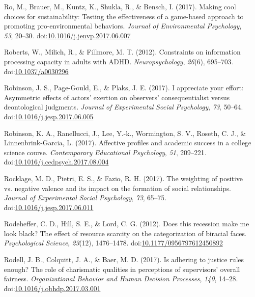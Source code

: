 \documentclass[english,man]{apa6}
\theoremstyle{definition}
\theoremstyle{definition}
\theoremstyle{definition}
\theoremstyle{remark}
\begin{document}
\hypertarget{ref-Ro2017}{}
Ro, M., Brauer, M., Kuntz, K., Shukla, R., \& Bensch, I. (2017). Making
cool choices for sustainability: Testing the effectiveness of a
game-based approach to promoting pro-environmental behaviors.
\emph{Journal of Environmental Psychology}, \emph{53}, 20--30.
doi:\href{https://doi.org/10.1016/j.jenvp.2017.06.007}{10.1016/j.jenvp.2017.06.007}

\hypertarget{ref-Roberts2012}{}
Roberts, W., Milich, R., \& Fillmore, M. T. (2012). Constraints on
information processing capacity in adults with ADHD.
\emph{Neuropsychology}, \emph{26}(6), 695--703.
doi:\href{https://doi.org/10.1037/a0030296}{10.1037/a0030296}

\hypertarget{ref-Robinson2017a}{}
Robinson, J. S., Page-Gould, E., \& Plaks, J. E. (2017). I appreciate
your effort: Asymmetric effects of actors' exertion on observers'
consequentialist versus deontological judgments. \emph{Journal of
Experimental Social Psychology}, \emph{73}, 50--64.
doi:\href{https://doi.org/10.1016/j.jesp.2017.06.005}{10.1016/j.jesp.2017.06.005}

\hypertarget{ref-Robinson2017}{}
Robinson, K. A., Ranellucci, J., Lee, Y.-k., Wormington, S. V., Roseth,
C. J., \& Linnenbrink-Garcia, L. (2017). Affective profiles and academic
success in a college science course. \emph{Contemporary Educational
Psychology}, \emph{51}, 209--221.
doi:\href{https://doi.org/10.1016/j.cedpsych.2017.08.004}{10.1016/j.cedpsych.2017.08.004}

\hypertarget{ref-Rocklage2017}{}
Rocklage, M. D., Pietri, E. S., \& Fazio, R. H. (2017). The weighting of
positive vs. negative valence and its impact on the formation of social
relationships. \emph{Journal of Experimental Social Psychology},
\emph{73}, 65--75.
doi:\href{https://doi.org/10.1016/j.jesp.2017.06.011}{10.1016/j.jesp.2017.06.011}

\hypertarget{ref-Rodeheffer2012}{}
Rodeheffer, C. D., Hill, S. E., \& Lord, C. G. (2012). Does this
recession make me look black? The effect of resource scarcity on the
categorization of biracial faces. \emph{Psychological Science},
\emph{23}(12), 1476--1478.
doi:\href{https://doi.org/10.1177/0956797612450892}{10.1177/0956797612450892}

\hypertarget{ref-Rodell2017}{}
Rodell, J. B., Colquitt, J. A., \& Baer, M. D. (2017). Is adhering to
justice rules enough? The role of charismatic qualities in perceptions
of supervisors' overall fairness. \emph{Organizational Behavior and
Human Decision Processes}, \emph{140}, 14--28.
doi:\href{https://doi.org/10.1016/j.obhdp.2017.03.001}{10.1016/j.obhdp.2017.03.001}
\end{document}
